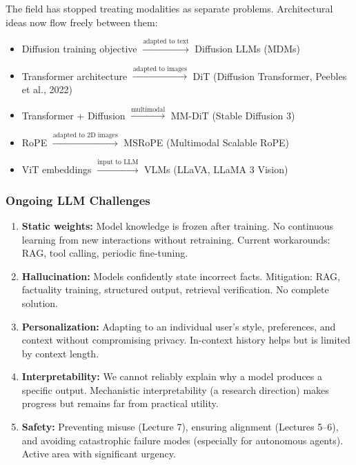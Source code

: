 \documentclass[11pt, a4paper]{article}
\begin{document}
The field has stopped treating modalities as separate problems. Architectural ideas now flow freely between them:

\begin{itemize}[leftmargin=2em]
  \item Diffusion training objective $\xrightarrow{\text{adapted to text}}$ Diffusion LLMs (MDMs)
  \item Transformer architecture $\xrightarrow{\text{adapted to images}}$ DiT (Diffusion Transformer, Peebles et al., 2022)
  \item Transformer + Diffusion $\xrightarrow{\text{multimodal}}$ MM-DiT (Stable Diffusion 3)
  \item RoPE $\xrightarrow{\text{adapted to 2D images}}$ MSRoPE (Multimodal Scalable RoPE)
  \item ViT embeddings $\xrightarrow{\text{input to LLM}}$ VLMs (LLaVA, LLaMA 3 Vision)
\end{itemize}

\subsubsection{Ongoing LLM Challenges}

\begin{defbox}
\begin{enumerate}[leftmargin=1.5em]
  \item \textbf{Static weights:} Model knowledge is frozen after training. No continuous learning from new interactions without retraining. Current workarounds: RAG, tool calling, periodic fine-tuning.
  \item \textbf{Hallucination:} Models confidently state incorrect facts. Mitigation: RAG, factuality training, structured output, retrieval verification. No complete solution.
  \item \textbf{Personalization:} Adapting to an individual user's style, preferences, and context without compromising privacy. In-context history helps but is limited by context length.
  \item \textbf{Interpretability:} We cannot reliably explain why a model produces a specific output. Mechanistic interpretability (a research direction) makes progress but remains far from practical utility.
  \item \textbf{Safety:} Preventing misuse (Lecture 7), ensuring alignment (Lectures 5--6), and avoiding catastrophic failure modes (especially for autonomous agents). Active area with significant urgency.
\end{enumerate}
\end{defbox}
\end{document}

